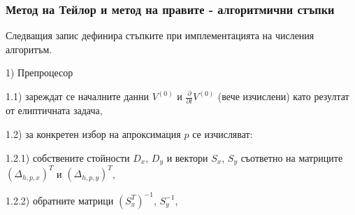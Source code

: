 \documentclass{article}
\theoremstyle{remark}
\begin{document}
\subsubsection{Метод на Тейлор и метод на правите - алгоритмични стъпки}

Следващия запис дефинира стъпките при имплементацията на числения алгоритъм.
\par
1) Препроцесор
\par
1.1) зареждат се началните данни $V^{(0)}$ и $\frac{\partial}{\partial t} V^{(0)}$ (вече изчислени) като резултат от елиптичната задача,
\par
1.2) за конкретен избор на апроксимация $p$ се изчисляват:
\par
1.2.1) собствените стойности $D_x$, $D_y$ и вектори $S_x$, $S_y$ съответно на матриците $(\Delta_{h,p,x})^T$ и $(\Delta_{h,p,y})^T$, 
\par
1.2.2) обратните матрици $(S_x^T)^{-1}$, $S_y^{-1}$,
\\
\end{document}
